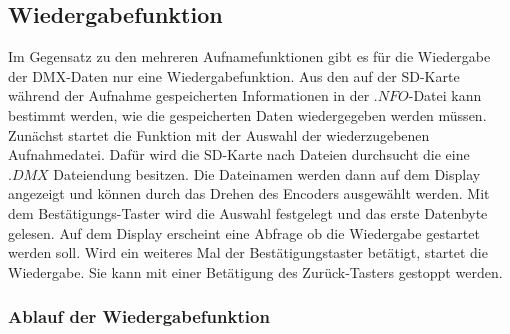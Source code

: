 
\subsection{Wiedergabefunktion}
Im Gegensatz zu den mehreren Aufnamefunktionen gibt es für die Wiedergabe der DMX-Daten nur eine Wiedergabefunktion. Aus den auf der SD-Karte während der Aufnahme gespeicherten Informationen in der $.NFO$-Datei kann bestimmt werden, wie die gespeicherten Daten wiedergegeben werden müssen. Zunächst startet die Funktion mit der Auswahl der wiederzugebenen Aufnahmedatei. Dafür wird die SD-Karte nach Dateien durchsucht die eine $.DMX$ Dateiendung besitzen. Die Dateinamen werden dann auf dem Display angezeigt und können durch das Drehen des Encoders ausgewählt werden. Mit dem Bestätigungs-Taster wird die Auswahl festgelegt und das erste Datenbyte gelesen. Auf dem Display erscheint eine Abfrage ob die Wiedergabe gestartet werden soll. Wird ein weiteres Mal der Bestätigungstaster betätigt, startet die Wiedergabe. Sie kann mit einer Betätigung des Zurück-Tasters gestoppt werden.

\subsubsection{Ablauf der Wiedergabefunktion}

